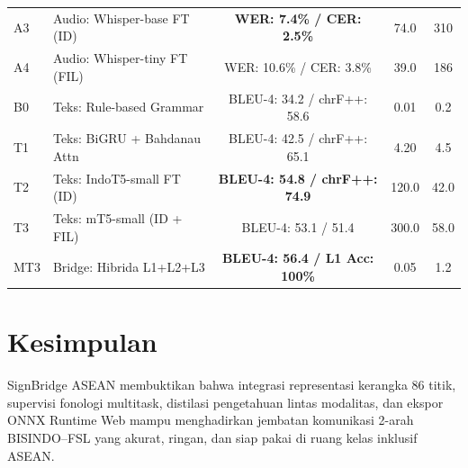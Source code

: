 \documentclass[conference]{IEEEtran}
\begin{document}
\begin{table}[htbp]
\begin{tabular}{llccc}
A3 & Audio: Whisper-base FT (ID) & \textbf{WER: 7.4\% / CER: 2.5\%} & 74.0 & 310 \\
A4 & Audio: Whisper-tiny FT (FIL) & WER: 10.6\% / CER: 3.8\% & 39.0 & 186 \\
\midrule
B0 & Teks: Rule-based Grammar & BLEU-4: 34.2 / chrF++: 58.6 & 0.01 & 0.2 \\
T1 & Teks: BiGRU + Bahdanau Attn & BLEU-4: 42.5 / chrF++: 65.1 & 4.20 & 4.5 \\
T2 & Teks: IndoT5-small FT (ID) & \textbf{BLEU-4: 54.8 / chrF++: 74.9} & 120.0 & 42.0 \\
T3 & Teks: mT5-small (ID + FIL) & BLEU-4: 53.1 / 51.4 & 300.0 & 58.0 \\
MT3 & Bridge: Hibrida L1+L2+L3 & \textbf{BLEU-4: 56.4 / L1 Acc: 100\%} & 0.05 & 1.2 \\
\bottomrule
\end{tabular}
\end{table}

\section{Kesimpulan}
SignBridge ASEAN membuktikan bahwa integrasi representasi kerangka 86 titik, supervisi fonologi multitask, distilasi pengetahuan lintas modalitas, dan ekspor ONNX Runtime Web mampu menghadirkan jembatan komunikasi 2-arah BISINDO--FSL yang akurat, ringan, dan siap pakai di ruang kelas inklusif ASEAN.



\end{document}
